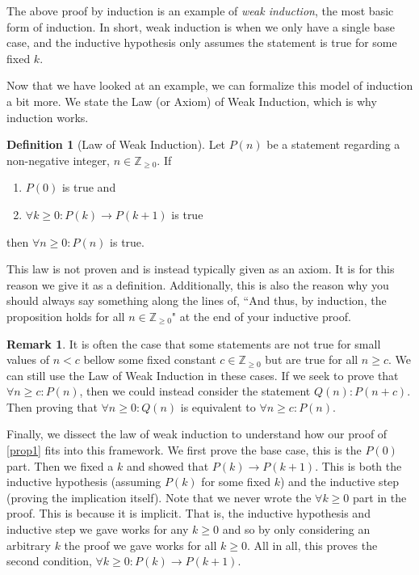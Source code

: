 \documentclass{article}
\newcommand{\ra}{\rightarrow}
\newcommand{\ZZ}{\mathbb{Z}_{\geq 0}}
\theoremstyle{plain}
\theoremstyle{definition}
\newtheorem{definition}{Definition}
\newtheorem{remark}{Remark}
\begin{document}
The above proof by induction is an example of \emph{weak induction}, the most basic form of induction. In short, weak induction is when we only have a single base case, and the inductive hypothesis only assumes the statement is true for some fixed \(k\).

Now that we have looked at an example, we can formalize this model of induction a bit more. We state the Law (or Axiom) of Weak Induction, which is why induction works.

\begin{definition}[Law of Weak Induction]\label{law_of_weak_ind}
    Let \(P(n)\) be a statement regarding a non-negative integer, \(n \in \ZZ\). If 
    \begin{enumerate}
        \item \(P(0)\) is true and
        \item \(\forall k \geq 0 : P(k) \ra P(k+1)\) is true
    \end{enumerate}
    then \(\forall n \geq 0 : P(n)\) is true.
\end{definition}

This law is not proven and is instead typically given as an axiom. It is for this reason we give it as a definition. Additionally, this is also the reason why you should always say something along the lines of, ``And thus, by induction, the proposition holds for all \(n \in \ZZ\)" at the end of your inductive proof. 

\begin{remark}
    It is often the case that some statements are not true for small values of \(n < c\) bellow some fixed constant \(c \in \ZZ\) but are true for all \(n \geq c\). We can still use the Law of Weak Induction in these cases. If we seek to prove that \(\forall n \geq c : P(n)\), then we could instead consider the statement \(Q(n) : P(n + c)\). Then proving that \(\forall n \geq 0: Q(n)\) is equivalent to \(\forall n \geq c : P(n)\).
\end{remark}

Finally, we dissect the law of weak induction to understand how our proof of \cref{prop1} fits into this framework. We first prove the base case, this is the \(P(0)\) part. Then we fixed a \(k\) and showed that \(P(k) \ra P(k+1)\). This is both the inductive hypothesis (assuming \(P(k)\) for some fixed \(k\)) and the inductive step (proving the implication itself). Note that we never wrote the \(\forall k \geq 0\) part in the proof. This is because it is implicit. That is, the inductive hypothesis and inductive step we gave works for any \(k \geq 0\) and so by only considering an arbitrary \(k\) the proof we gave works for all \(k \geq 0\). All in all, this proves the second condition, \(\forall k \geq 0 : P(k) \ra P(k+1)\).
\end{document}

